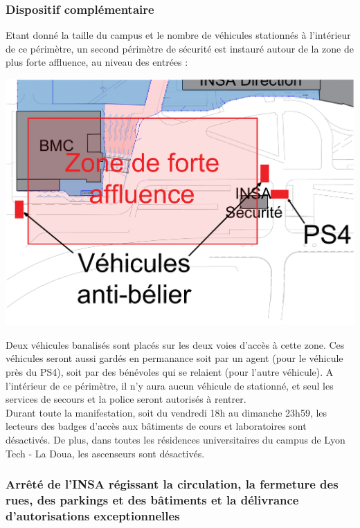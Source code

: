 \documentclass[hidelinks, paper=a4, fontsize=13pt]{report}
\begin{document}
\subsubsection{Dispositif complémentaire}
\label{perimetre}

Etant donné la taille du campus et le nombre de véhicules stationnés à l'intérieur de ce périmètre, un second périmètre de sécurité est instauré autour de la zone de plus forte affluence, au niveau des entrées :

\begin{center}
	\includegraphics[width=.8\textwidth,keepaspectratio]{Exports/Plan_24h_44eme-Vehicules_beliers}
\end{center}

Deux véhicules banalisés sont placés sur les deux voies d'accès à cette zone. Ces véhicules seront aussi gardés en permanance soit par un agent (pour le véhicule près du PS4), soit par des bénévoles qui se relaient (pour l'autre véhicule). A l'intérieur de ce périmètre, il n'y aura aucun véhicule de stationné, et seul les services de secours et la police seront autorisés à rentrer.
\\
Durant toute la manifestation, soit du vendredi 18h au dimanche 23h59, les lecteurs des badges d’accès aux bâtiments de cours et laboratoires sont désactivés. De plus, dans toutes les résidences universitaires du campus de Lyon Tech - La Doua, les ascenseurs sont désactivés.\\


\subsubsection{Arrêté de l'INSA régissant la circulation, la fermeture des rues, des parkings et des bâtiments et la délivrance d'autorisations exceptionnelles}
\end{document}
